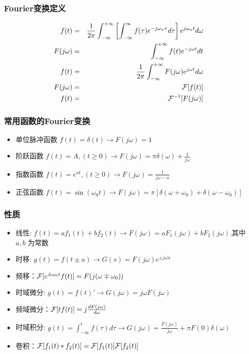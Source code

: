 \documentclass{beamer}
\begin{document}
\begin{frame}
\frametitle{Fourier变换定义}
\label{sec-5-4}

\begin{eqnarray*}
f(t)& = &\frac{1}{2\pi}\int_{-\infty}^{+\infty}\left[ \int_{-\infty }^{\infty}f(\tau)e^{-j\omega_n\tau}d\tau\right]e^{j\omega_n t}d\omega \\
F(j\omega)&=& \int_{-\infty}^{ + \infty}f(t)e^{-j\omega t}dt \\
f(t)  & =& \frac{1}{2\pi} \int_{-\infty}^{+\infty}F(j\omega)e^{j\omega t}d\omega \\
F(j\omega) &=& {\cal F}[f(t)] \\
f(t) &=& {\cal F}^{-1}[F(j\omega)] 
\end{eqnarray*}
\end{frame}
\begin{frame}
\frametitle{常用函数的Fourier变换}
\label{sec-5-5}

\begin{itemize}
\item 单位脉冲函数 $f(t)=\delta(t) \rightarrow   F(j\omega)=1$
\item 阶跃函数 $f(t)=A,(t\geq 0) \rightarrow   F(j\omega)=\pi\delta(\omega)+\frac{1}{j\omega}$
\item 指数函数 $f(t)=e^{at},(t\geq 0) \rightarrow  F(j\omega)=\frac{1}{j\omega-a}$
\item 正弦函数 $f(t)=\sin(\omega_0 t)\rightarrow F(j\omega)=\pi[\delta(\omega+\omega_0)+\delta(\omega-\omega_0)]$
\end{itemize}
\end{frame}
\begin{frame}
\frametitle{性质}
\label{sec-5-6}

\begin{itemize}
\item 线性: $f(t)=af_1(t)+bf_2(t)\rightarrow  F(j\omega)=aF_1(j\omega)+bF_2(j\omega)$,其中 $a,b$ 为常数
\item 时移: $g(t)=f(t\pm a) \rightarrow  G(s)=F(j\omega)e^{\pm j\omega a}$
\item 频移：${\cal F}[e^{\pm\omega_0 t}f(t)]=F(j(\omega\mp\omega_0))$
\item 时域微分: $g(t)=f(t)'\rightarrow  G(j\omega)=j\omega F(j\omega)$
\item 频域微分：${\cal F}[tf(t)]=j\frac{dF(j\omega)}{d\omega}$
\item 时域积分: $g(t)=\int_{-\infty}^{t} f(\tau) d\tau \rightarrow  G(j\omega)=\frac{F(j\omega)}{j\omega}+\pi F(0)\delta(\omega)$
\item 卷积：${\cal F}[f_1(t)*f_2(t)]={\cal F}[f_1(t)]{\cal F}[f_2(t)]$
\end{itemize}
\end{frame}
\end{document}
